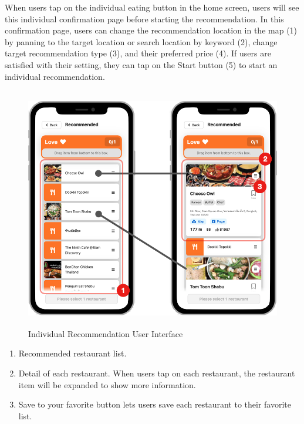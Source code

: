 \documentclass[12pt,oneside,openright,a4paper]{cpe-english-project}
\begin{document}
When users tap on the individual eating button in the home screen, users will see this individual confirmation page before starting the recommendation. In this confirmation page, users can change the recommendation location in the map (1) by panning to the target location or search location by keyword (2), change target recommendation type (3), and their preferred price (4). If users are satisfied with their setting, they can tap on the Start button (5) to start an individual recommendation.
\begin{figure}[H]\centering
\includegraphics[height=300pt]{./images/4ui_IndividualRecommendationUserInterface.png}
\caption{Individual Recommendation User Interface}\label{fig:4ui_IndividualRecommendationUserInterface}
\end{figure}

\begin{enumerate}
\item Recommended restaurant list.
\item Detail of each restaurant. When users tap on each restaurant, the restaurant item will be expanded to show more information.
\item Save to your favorite button lets users save each restaurant to their favorite list.
\end{enumerate}
\end{document}
